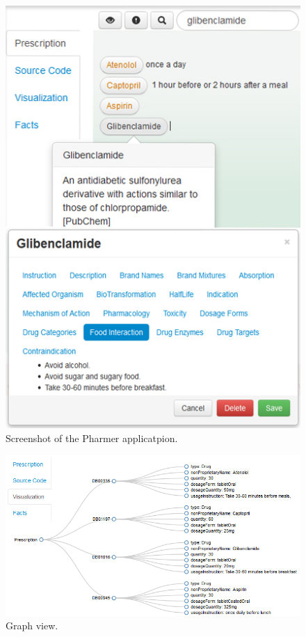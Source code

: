 \documentclass[conference]{IEEEtran}
\begin{document}
\begin{figure}[tb]
	\centering
		\includegraphics[width=1\columnwidth]{images/screenshot.jpg}
	\caption{Screenshot of the Pharmer applicatpion.}
	\label{fig:screenshot}
\end{figure}

\begin{figure}[tb]
	\centering
		\includegraphics[width=1\columnwidth]{images/sc2.png}
	\caption{Graph view.}
	\label{fig:graphview}
\end{figure}
\end{document}

